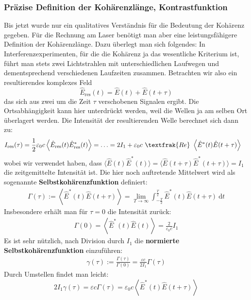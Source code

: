 \documentclass[german,  %
parskip=full,  %
]{scrartcl}
\begin{document}
\subsubsection{Präzise Definition der Kohärenzlänge, Kontrastfunktion}
Bis jetzt wurde nur ein qualitatives Verständnis für die Bedeutung der Kohärenz gegeben. Für die Rechnung am Laser benötigt man aber eine leistungsfähigere Definition der Kohärenzlänge. Dazu überlegt man sich folgendes: In Interferenzexperimenten, für die die Kohärenz ja das wesentliche Kriterium ist, führt man stets zwei Lichtstrahlen mit unterschiedlichen Laufwegen und dementsprechend verschiedenen Laufzeiten zusammen. Betrachten wir also ein resultierendes komplexes Feld
\[\hat{E}_{\mathrm{res}}(t) = \hat{E}(t) + \hat{E}(t+\tau)\]
das sich aus zwei um die Zeit \(\tau\) verschobenen Signalen ergibt. Die Ortsabhängigkeit kann hier unterdrückt werden, weil die Wellen ja am selben Ort überlagert werden. Die Intensität der resultierenden Welle berechnet sich dann zu:
\begin{align*}
I_{\mathrm{res}}(\tau) &= \frac{1}{2}\varepsilon_0 c \left\langle \hat{E}_{\mathrm{res}}(t) \hat{E}_{\mathrm{res}}^{*}(t)\right\rangle = \hdots =  2 I_1 + \varepsilon_0 c \ \textfrak{Re} \ \left\langle\hat{E}^{*}(t)\hat{E}(t+\tau)\right\rangle 
\end{align*} 
wobei wir verwendet haben, dass \(\langle \hat{E}(t)\hat{E}^{*}(t)\rangle = \langle\hat{E}(t+\tau)\hat{E}^{*}(t+\tau) \rangle = I_1\) die zeitgemittelte Intensität ist. Die hier noch auftretende Mittelwert wird als sogenannte \textbf{Selbstkohärenzfunktion} definiert:
\begin{align}
\Gamma(\tau) := \left\langle\hat{E}^{*}(t)\hat{E}(t+\tau)\right\rangle = \lim_{T\rightarrow\infty} \int_{-\frac{T}{2}}^{\frac{T}{2}} \hat{E}^{*}(t)\hat{E}(t+\tau) \ \mathrm{d}t
\end{align}
Insbesondere erhält man für \(\tau=0\) die Intensität zurück:
\begin{align*}
\Gamma(0) = \left\langle\hat{E}^{*}(t)\hat{E}(t)\right\rangle = \frac{2}{\varepsilon_0 c}I_1
\end{align*}
Es ist sehr nützlich, nach Division durch \(I_1\) die \textbf{normierte Selbstkohärenzfunktion} einzuführen:
\begin{align}
\gamma(\tau) := \frac{\Gamma(\tau)}{\Gamma(0)} = \frac{\varepsilon c}{2I_1}\Gamma(\tau)
\end{align}
Durch Umstellen findet man leicht:
\[2I_1\gamma(\tau) =  \varepsilon c \Gamma(\tau)= \varepsilon_0 c \left\langle\hat{E}^{*}(t)\hat{E}(t+\tau)\right\rangle \]
\end{document}
